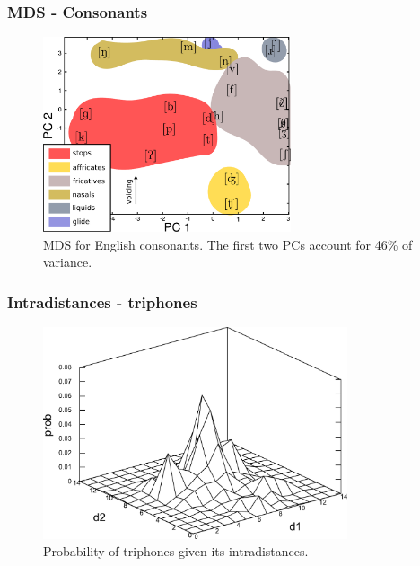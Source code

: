 \documentclass[notes]{beamer}
\begin{document}
\frame
{
  \frametitle{MDS - Consonants}
  \begin{figure}[h]
  \centering
  \includegraphics[width=0.65\textwidth]{imagespresentation/mds_consonants_en_classes.pdf}
  \caption{MDS for English consonants. The first two PCs account for 46\% of variance.}
  \end{figure}
}


\frame
{
  \frametitle{Intradistances - triphones}
  \vspace{-0.1cm}
  \begin{figure}[h]
  \centering  
  \includegraphics[width=0.8\textwidth]{images/ulysses_triphones_intradistances_mesh.pdf} 
  \caption{Probability of triphones given its intradistances.}
  \end{figure} 
}
\end{document}
